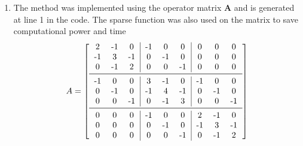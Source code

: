 \begin{enumerate}
	\item {\color{blue} The method was implemented using the operator matrix $\mathbf{A}$ \cite{Demmel:1997:ANL:264989} and is generated at line 1 in the code.  The sparse function was also used on the matrix to save computational power and time
	\begin{equation}
			A = \left[
			\begin{tabular}{ccc|ccc|ccc}
			2  & -1 & 0		& -1 & 0 & 0 	& 0 & 0 & 0\\
			-1 & 3  & -1 	& 0 & -1 & 0 	& 0 & 0 & 0\\
			0  & -1 & 2  	& 0 & 0 & -1 	& 0 & 0 & 0\\
			\midrule
			-1 & 0  & 0  	& 3 & -1 & 0 	& -1 & 0 & 0\\
			0  & -1 & 0  	& -1 & 4 & -1 	& 0 & -1 & 0\\
			0  & 0  & -1 	& 0 & -1 & 3 	& 0 & 0 & -1\\
			\midrule
			0  & 0  & 0  	& -1 & 0 & 0 	& 2 & -1 & 0\\
			0  & 0  & 0  	& 0 & -1 & 0 	& -1 & 3 & -1\\
			0  & 0  & 0  	& 0 & 0 & -1 	& 0 & -1 & 2\\
			\end{tabular}\right]
			\label{eq:matrixA}
		\end{equation}}
\end{enumerate}

